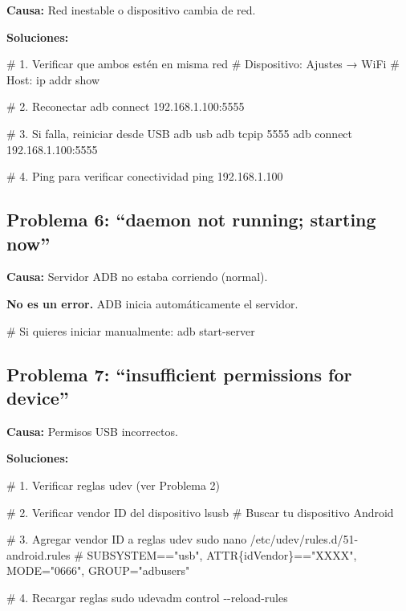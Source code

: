 \documentclass[
  doc,
  floatsintext,
  longtable,
  a4paper,
  nolmodern,
  notxfonts,
  notimes,
  12pt,
  colorlinks=true,linkcolor=blue,citecolor=blue,urlcolor=blue]{apa7}
\newenvironment{Shaded}{\begin{snugshade}}{\end{snugshade}}
\newcommand{\AttributeTok}[1]{\textcolor[rgb]{0.40,0.45,0.13}{#1}}
\newcommand{\CommentTok}[1]{\textcolor[rgb]{0.37,0.37,0.37}{#1}}
\newcommand{\ExtensionTok}[1]{\textcolor[rgb]{0.00,0.23,0.31}{#1}}
\newcommand{\FunctionTok}[1]{\textcolor[rgb]{0.28,0.35,0.67}{#1}}
\newcommand{\NormalTok}[1]{\textcolor[rgb]{0.00,0.23,0.31}{#1}}
\begin{document}
\textbf{Causa:} Red inestable o dispositivo cambia de red.

\textbf{Soluciones:}

\begin{Shaded}
\begin{Highlighting}[]
\CommentTok{\# 1. Verificar que ambos estén en misma red}
\CommentTok{\# Dispositivo: Ajustes → WiFi}
\CommentTok{\# Host: ip addr show}

\CommentTok{\# 2. Reconectar}
\ExtensionTok{adb}\NormalTok{ connect 192.168.1.100:5555}

\CommentTok{\# 3. Si falla, reiniciar desde USB}
\ExtensionTok{adb}\NormalTok{ usb}
\ExtensionTok{adb}\NormalTok{ tcpip 5555}
\ExtensionTok{adb}\NormalTok{ connect 192.168.1.100:5555}

\CommentTok{\# 4. Ping para verificar conectividad}
\FunctionTok{ping}\NormalTok{ 192.168.1.100}
\end{Highlighting}
\end{Shaded}

\subsection{Problema 6: ``daemon not running; starting
now''}\label{problema-6-daemon-not-running-starting-now}

\textbf{Causa:} Servidor ADB no estaba corriendo (normal).

\textbf{No es un error.} ADB inicia automáticamente el servidor.

\begin{Shaded}
\begin{Highlighting}[]
\CommentTok{\# Si quieres iniciar manualmente:}
\ExtensionTok{adb}\NormalTok{ start{-}server}
\end{Highlighting}
\end{Shaded}

\subsection{Problema 7: ``insufficient permissions for
device''}\label{problema-7-insufficient-permissions-for-device}

\textbf{Causa:} Permisos USB incorrectos.

\textbf{Soluciones:}

\begin{Shaded}
\begin{Highlighting}[]
\CommentTok{\# 1. Verificar reglas udev (ver Problema 2)}

\CommentTok{\# 2. Verificar vendor ID del dispositivo}
\ExtensionTok{lsusb}
\CommentTok{\# Buscar tu dispositivo Android}

\CommentTok{\# 3. Agregar vendor ID a reglas udev}
\FunctionTok{sudo}\NormalTok{ nano /etc/udev/rules.d/51{-}android.rules}
\CommentTok{\# SUBSYSTEM=="usb", ATTR\{idVendor\}=="XXXX", MODE="0666", GROUP="adbusers"}

\CommentTok{\# 4. Recargar reglas}
\FunctionTok{sudo}\NormalTok{ udevadm control }\AttributeTok{{-}{-}reload{-}rules}
\end{Highlighting}
\end{Shaded}
\end{document}
